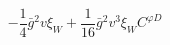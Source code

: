 %
\begin{dmath*}
%
  -  \frac{1}{4} {\bar g}{}^2 v \xi_W   +  \frac{1}{16} {\bar g}{}^2 v^3 \xi_WC^{ \varphi  D}
%
\end{dmath*}
%
